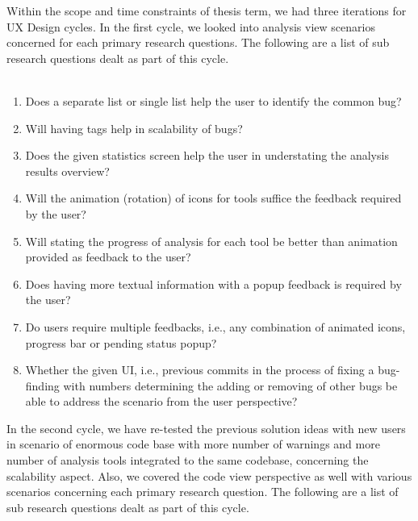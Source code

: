 Within the scope and time constraints of thesis term, we had three iterations for UX Design cycles. In the first cycle, we looked into analysis view scenarios concerned for each primary research questions. The following are a list of sub research questions dealt as part of this cycle. \\ \\
\clearpage
\begin{enumerate}
	\item Does a separate list or single list help the user to identify the common bug?
	\item Will having tags help in scalability of bugs?
	\item Does the given statistics screen help the user in understating the analysis results overview?
	\item Will the animation (rotation) of icons for tools suffice the feedback required by the user?
	\item Will stating the progress of analysis for each tool be better than animation provided as feedback to the user?
	\item Does having more textual information with a popup feedback is required by the user?
	\item Do users require multiple feedbacks, i.e., any combination of animated icons, progress bar or pending status popup?
	\item Whether the given UI, i.e., previous commits in the process of fixing a bug-finding with numbers determining the adding or removing of other bugs be able to address the scenario from the user perspective? \\
\end{enumerate}

In the second cycle, we have re-tested the previous solution ideas with new users in scenario of enormous code base with more number of warnings and more number of analysis tools integrated to the same codebase, concerning the scalability aspect. Also, we covered the code view perspective as well with various scenarios concerning each primary research question. The following are a list of sub research questions dealt as part of this cycle.\\ \\ 

